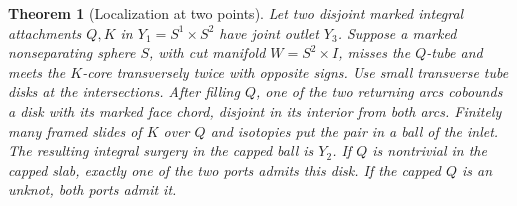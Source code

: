 \documentclass[11pt,letterpaper]{article}
\numberwithin{equation}{section}
\newtheorem{theorem}{Theorem}[section]
\theoremstyle{remark}
\begin{document}
\begin{theorem}[Localization at two points]\label{thm:two-port}
Let two disjoint marked integral attachments \(Q,K\) in
\(Y_1=S^1\times S^2\) have joint outlet \(Y_3\). Suppose a marked
nonseparating sphere \(S\), with cut manifold \(W=S^2\times I\), misses
the \(Q\)-tube and meets the \(K\)-core transversely twice with opposite
signs. Use small transverse tube disks at the intersections.
After filling \(Q\), one of the two returning arcs cobounds a disk with
its marked face chord, disjoint in its interior from both arcs.
Finitely many framed slides of \(K\) over \(Q\) and isotopies put the
pair in a ball of the inlet. The resulting integral surgery in the
capped ball is \(Y_2\). If \(Q\) is nontrivial in the capped slab,
exactly one of the two ports admits this disk. If the capped \(Q\) is
an unknot, both ports admit it.
\end{theorem}
\end{document}
